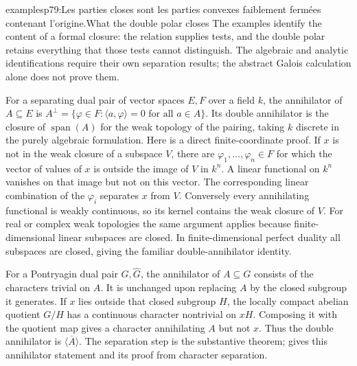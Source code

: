 \begin{dcomment}{examples}{p79:Les parties closes sont les parties convexes faiblement fermées contenant l'origine.}{What the double polar closes}
The examples identify the content of a formal closure: the relation supplies tests, and the double polar retains everything that those tests cannot distinguish. The algebraic and analytic identifications require their own separation results; the abstract Galois calculation alone does not prove them.

For a separating dual pair of vector spaces $E,F$ over a field $k$, the annihilator of $A\subseteq E$ is $A^\perp=\{\varphi\in F:\langle a,\varphi\rangle=0\text{ for all }a\in A\}$. Its double annihilator is the closure of $\operatorname{span}(A)$ for the weak topology of the pairing, taking $k$ discrete in the purely algebraic formulation. Here is a direct finite-coordinate proof. If $x$ is not in the weak closure of a subspace $V$, there are $\varphi_1,\ldots,\varphi_n\in F$ for which the vector of values of $x$ is outside the image of $V$ in $k^n$. A linear functional on $k^n$ vanishes on that image but not on this vector. The corresponding linear combination of the $\varphi_i$ separates $x$ from $V$. Conversely every annihilating functional is weakly continuous, so its kernel contains the weak closure of $V$. For real or complex weak topologies the same argument applies because finite-dimensional linear subspaces are closed. In finite-dimensional perfect duality all subspaces are closed, giving the familiar double-annihilator identity.

For a Pontryagin dual pair $G,\widehat G$, the annihilator of $A\subseteq G$ consists of the characters trivial on $A$. It is unchanged upon replacing $A$ by the closed subgroup it generates. If $x$ lies outside that closed subgroup $H$, the locally compact abelian quotient $G/H$ has a continuous character nontrivial on $xH$. Composing it with the quotient map gives a character annihilating $A$ but not $x$. Thus the double annihilator is $\overline{\langle A\rangle}$. The separation step is the substantive theorem; \citet[Chapter 7, Proposition 38]{Morris1977} gives this annihilator statement and its proof from character separation.


\end{dcomment}
